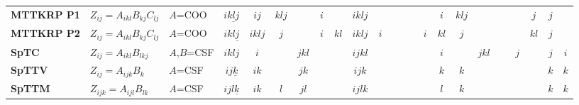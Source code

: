 \begin{table}
{\begin{tabular}{@{}lllc|ccc|cccccc|cccccc|ccc@{}}
        \textbf{MTTKRP P1} & $Z_{ij} = A_{ikl}B_{kj}C_{lj}$ & $A$=COO & $i\underline{klj}$ & $ij$ & $klj$ & ~ & $i$ & ~ & $iklj$ & ~ & ~ & ~ & ~ & $i$ & $klj$ & ~ & ~ & ~ & $j$ & $j$ & ~ \\
        \textbf{MTTKRP P2} & $Z_{ij} = A_{ikl}B_{kj}C_{lj}$ & $A$=COO & $ikl\underline{j}$ & $iklj$ & $j$ & ~ & $i$ & $kl$ & $iklj$ & $i$ & ~ & ~ & $i$ & $kl$ & $j$ & ~ & ~ & ~ & $kl$ & $j$ & ~ \\
        \textbf{SpTC} & $Z_{ij} = A_{ikl}B_{lkj}$ & $A$,$B$=CSF & $iklj$ & $i$ & ~ & $jkl$ & ~ & ~ & $ijkl$ & ~ & ~ & ~ & ~ & $i$ & ~ & $jkl$ & ~ & $j$ & ~ & $j$ & $i$ \\
        \textbf{SpTTV} & $Z_{ij} = A_{ijk}B_{k}$ & $A$=CSF & $ij\underline{k}$ & $ik$ & ~ & $jk$ & ~ & ~ & $ijk$ & ~ & ~ & ~ & ~ & $k$ & $k$ & ~ & ~ & ~ & ~ & $k$ & $k$ \\
        \textbf{SpTTM} & $Z_{ijk} = A_{ijl}B_{lk}$ & $A$=CSF & $ijl\underline{k}$ & $ik$ & $l$ & $jl$ & ~ & ~ & $ijlk$ & ~ & ~ & ~ & ~ & $l$ & $k$ & ~ & ~ & ~ & ~ & $k$ & $k$ \\
        \bottomrule
    \end{tabular}}    
\end{table}
